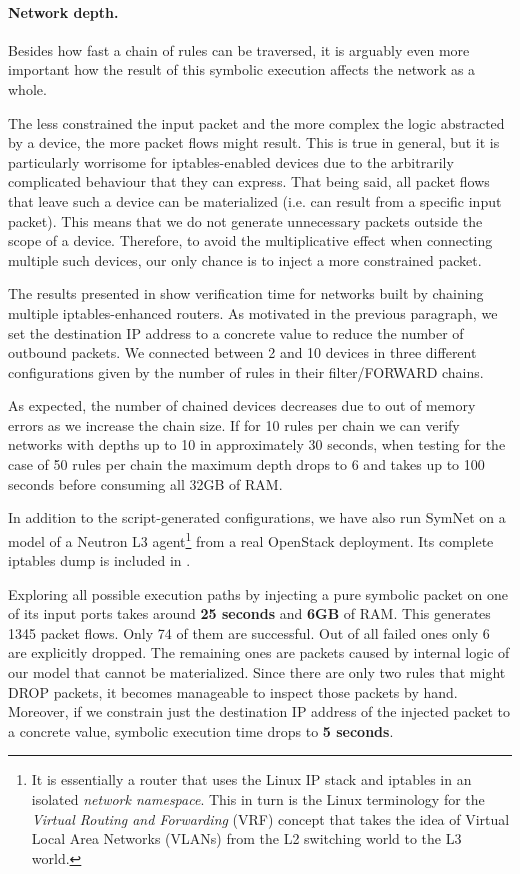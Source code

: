 \paragraph{Network depth.}  Besides how fast a chain of rules can be traversed,
it is arguably even more important how the result of this symbolic execution
affects the network as a whole.

The less constrained the input packet and the more complex the logic abstracted
by a device, the more packet flows might result.  This is true in general, but
it is particularly worrisome for iptables-enabled devices due to the
arbitrarily complicated behaviour that they can express.  That being said, all
packet flows that leave such a device can be materialized (i.e. can result from
a specific input packet).  This means that we do not generate unnecessary
packets outside the scope of a device.  Therefore, to avoid the multiplicative
effect when connecting multiple such devices, our only chance is to inject a
more constrained packet.

The results presented in  show
verification time for networks built by chaining multiple iptables-enhanced
routers.  As motivated in the previous paragraph, we set the destination IP
address to a concrete value to reduce the number of outbound packets.  We
connected between 2 and 10 devices in three different configurations given by
the number of rules in their filter/FORWARD chains.

As expected, the number of chained devices decreases due to out of memory
errors as we increase the chain size.  If for 10 rules per chain we can verify
networks with depths up to 10 in approximately 30 seconds, when testing for the
case of 50 rules per chain the maximum depth drops to 6 and takes up to 100
seconds before consuming all 32GB of RAM.

\bigskip

In addition to the script-generated configurations, we have also run SymNet on
a model of a Neutron L3 agent\footnote{It is essentially a router that uses the
Linux IP stack and iptables in an isolated \emph{network namespace}.  This in
turn is the Linux terminology for the \emph{Virtual Routing and Forwarding}
(VRF) concept that takes the idea
of Virtual Local Area Networks (VLANs)
from the L2 switching world to the L3 world.} from a real OpenStack deployment.
Its complete iptables dump is included in
.

Exploring all possible execution paths by injecting a pure symbolic packet on
one of its input ports takes around \textbf{25 seconds} and \textbf{6GB} of
RAM.  This generates 1345 packet flows.  Only 74 of them are successful.  Out
of all failed ones only 6 are explicitly dropped.  The remaining ones are
packets caused by internal logic of our model that cannot be materialized.
Since there are only two rules that might DROP packets, it becomes manageable
to inspect those packets by hand.  Moreover, if we constrain just the
destination IP address of the injected packet to a concrete value, symbolic
execution time drops to \textbf{5 seconds}.
